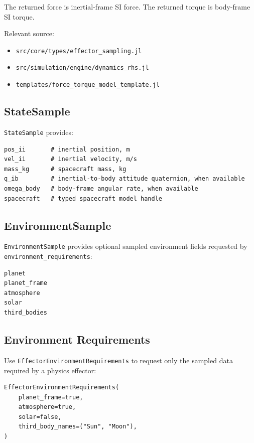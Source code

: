 \documentclass[11pt]{article}
\begin{document}
The returned force is inertial-frame SI force. The returned torque is body-frame
SI torque.

Relevant source:
\begin{itemize}
  \item \texttt{src/core/types/effector\_sampling.jl}
  \item \texttt{src/simulation/engine/dynamics\_rhs.jl}
  \item \texttt{templates/force\_torque\_model\_template.jl}
\end{itemize}

\subsection{StateSample}

\texttt{StateSample} provides:

\begin{lstlisting}
pos_ii       # inertial position, m
vel_ii       # inertial velocity, m/s
mass_kg      # spacecraft mass, kg
q_ib         # inertial-to-body attitude quaternion, when available
omega_body   # body-frame angular rate, when available
spacecraft   # typed spacecraft model handle
\end{lstlisting}

\subsection{EnvironmentSample}

\texttt{EnvironmentSample} provides optional sampled environment fields
requested by \texttt{environment\_requirements}:

\begin{lstlisting}
planet
planet_frame
atmosphere
solar
third_bodies
\end{lstlisting}

\subsection{Environment Requirements}

Use \texttt{EffectorEnvironmentRequirements} to request only the sampled data
required by a physics effector:

\begin{lstlisting}
EffectorEnvironmentRequirements(
    planet_frame=true,
    atmosphere=true,
    solar=false,
    third_body_names=("Sun", "Moon"),
)
\end{lstlisting}
\end{document}
